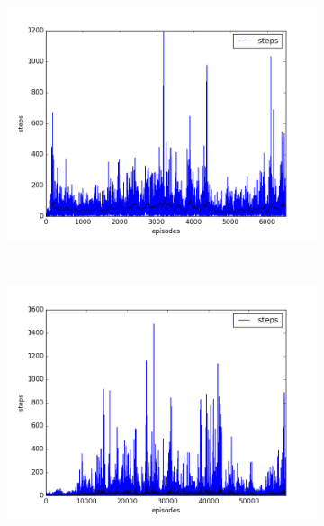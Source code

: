 \begin{figure}[t]
  \vspace*{-2cm}
  \begin{subfigure}[t]{\figscale\linewidth}
    \hspace*{-2.75cm}
    \includegraphics[width=1.5\textwidth]
    {../results/dqn_1vs2/steps.png}
    \label{fig:dqn-1vs2-steps}
  \end{subfigure}
  ~
  \begin{subfigure}[t]{\figscale\linewidth}
    \hspace*{-1.4cm}
    \includegraphics[width=1.5\textwidth]
    {../results/ddpg_1vs2/steps.png}
    \label{fig:ddpg-1vs2-steps}
  \end{subfigure}

\end{figure}
